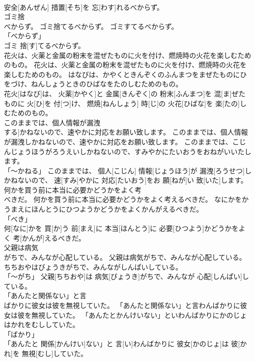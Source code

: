 \documentclass[8pt]{extreport}
\begin{document}
\begin{CJK}{UTF8}{min}
\\	安全[あんぜん] 措置[そち]を 忘[わす]れるべからず。		
\\	ゴミ捨
\\	べからず。	ゴミ捨てるべからず。	ゴミすてるべからず。	
\\	「べからず」 
\\	ゴミ 捨[す]てるべからず。		
\\	花火は、火薬と金属の粉末を混ぜたものに火を付け、燃焼時の火花を楽しむためのもの。	花火は、火薬と金属の粉末を混ぜたものに火を付け、燃焼時の火花を楽しむためのもの。	はなびは、かやくときんぞくのふんまつをまぜたものにひをづけ、ねんしょうときのひばなをたのしむためのもの。	
\\	花火[はなび]は、 火薬[かやく]と 金属[きんぞく]の 粉末[ふんまつ]を 混[ま]ぜたものに 火[ひ]を 付[つ]け、 燃焼[ねんしょう] 時[じ]の 火花[ひばな]を 楽[たの]しむためのもの。		
\\	このままでは、個人情報が漏洩
\\	する]かねないので、速やかに対応をお願い致します。	このままでは、個人情報が漏洩しかねないので、速やかに対応をお願い致します。	このままでは、こじんじょうほうがろうえいしかねないので、すみやかにたいおうをおねがいいたします。	
\\	「～かねる」	このままでは、 個人[こじん] 情報[じょうほう]が 漏洩[ろうせつ]しかねないので、 速[すみ]やかに 対応[たいおう]をお 願[ねが]い 致[いた]します。		
\\	何かを買う前に本当に必要かどうかをよく考
\\	べきだ。	何かを買う前に本当に必要かどうかをよく考えるべきだ。	なにかをかうまえにほんとうにひつようかどうかをよくかんがえるべきだ。	
\\	「べき」 
\\	何[なに]かを 買[か]う 前[まえ]に 本当[ほんとう]に 必要[ひつよう]かどうかをよく 考[かんが]えるべきだ。		
\\	父親は病気
\\	がちで、みんなが心配している。	父親は病気がちで、みんなが心配している。	ちちおやはびょうきがちで、みんながしんぱいしている。	
\\	「～がち」	父親[ちちおや]は 病気[びょうき]がちで、みんなが 心配[しんぱい]している。		
\\	「あんたと関係ない」と言
\\	ばかりに彼女は彼を無視していた。	「あんたと関係ない」と言わんばかりに彼女は彼を無視していた。	「あんたとかんけいない」といわんばかりにかのじょはかれをむししていた。	
\\	「ばかり」 
\\	「あんたと 関係[かんけい]ない」と 言[い]わんばかりに 彼女[かのじょ]は 彼[かれ]を 無視[むし]していた。		

\end{CJK}
\end{document}
